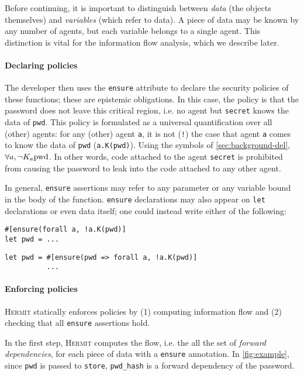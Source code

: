 \documentclass[letterpaper,twocolumn,10pt]{article}
\newcommand{\Hermit}{\textsc{Hermit}}
\begin{document}
Before continuing, it is important to distinguish between \emph{data} (the objects themselves) and
\emph{variables} (which refer to data). A piece of data may be known by any number of agents, but
each variable belongs to a single agent. This distinction is vital for the information flow
analysis, which we describe later.

\paragraph{Declaring policies}
The developer then uses the \lstinline{ensure} attribute to declare the security policies of these
functions; these are epistemic obligations. In this case, the policy is that the password does not
leave this critical region, i.e. no agent but \lstinline{secret} knows the data of \lstinline{pwd}.
This policy is formulated as a universal quantification over all (other) agents: for any (other)
agent \lstinline{a}, it is not (\lstinline{!}) the case that agent \lstinline{a} comes to know the
data of \lstinline{pwd} (\lstinline{a.K(pwd)}). Using the symbols of \cref{sec:background-del},
\(\forall a, \lnot K_a \text{\lstinline{pwd}}\). In other words, code attached
to the agent \lstinline{secret} is prohibited from causing the password to leak into the code
attached to any other agent.

In general, \lstinline{ensure} assertions may refer to any parameter or any variable bound in the body
of the function. \lstinline{ensure} declarations may also appear on \lstinline{let} declarations or
even data itself; one could instead write either of the following:

\begin{lstlisting}[firstnumber=16]
#[ensure(forall a, !a.K(pwd)]
let pwd = ...
\end{lstlisting}

\begin{lstlisting}[firstnumber=16]
let pwd = #[ensure(pwd => forall a, !a.K(pwd)]
          ...
\end{lstlisting}

\paragraph{Enforcing policies}
\Hermit{} statically enforces policies by (1) computing information flow and (2) checking that all
\lstinline{ensure} assertions hold.

In the first step, \Hermit{} computes the flow, i.e. the all the set of \emph{forward dependencies},
for each piece of data with a \lstinline{ensure} annotation. In \cref{fig:example}, since
\lstinline{pwd} is passed to \lstinline{store}, \lstinline{pwd_hash} is a forward dependency of the
password.
\end{document}
